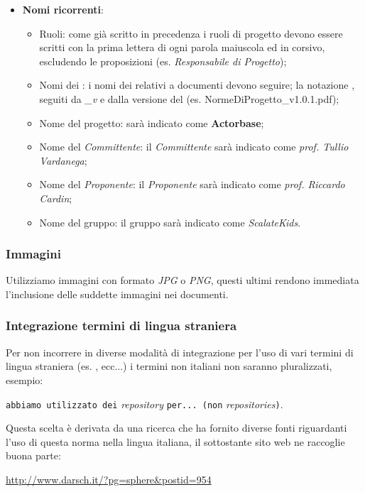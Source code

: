 \documentclass{scalatekids-article}
\begin{document}
\begin{itemize}
    \item \textbf{Nomi ricorrenti}:
        \begin{itemize}
            \item Ruoli: come già scritto in precedenza i ruoli di progetto devono essere scritti con la prima lettera di ogni parola maiuscola ed in corsivo, escludendo le proposizioni (es. \textit{Responsabile di Progetto});
            \item Nomi dei : i nomi dei  relativi a documenti devono seguire;
                la notazione \textit{}, seguiti da \textit{\_v} e dalla
                versione del  (es. NormeDiProgetto\_v1.0.1.pdf);
            \item Nome del progetto: sarà indicato come \textbf{Actorbase};
            \item Nome del \textit{Committente}: il \textit{Committente} sarà indicato come \textit{prof. Tullio Vardanega};
            \item Nome del \textit{Proponente}: il \textit{Proponente} sarà indicato come \textit{prof. Riccardo Cardin};
            \item Nome del gruppo: il gruppo sarà indicato come \textit{ScalateKids}.
        \end{itemize}
\end{itemize}

\subsubsection{Immagini}

Utilizziamo immagini con formato \textit{JPG} o \textit{PNG}, questi ultimi rendono immediata l'inclusione delle suddette immagini nei documenti.

\subsubsection{Integrazione termini di lingua straniera}

Per non incorrere in diverse modalità di integrazione per l'uso di vari termini di lingua straniera (es. ,  ecc...) i termini non italiani non saranno pluralizzati, esempio:\\
\begin{center}
    \verb=abbiamo utilizzato dei= \textit{repository} \verb=per... (non= \textit{repositories}\verb=)=.
\end{center}
Questa scelta è derivata da una ricerca che ha fornito diverse fonti riguardanti l'uso di questa norma nella lingua italiana, il sottostante sito web ne raccoglie buona parte:\\
\begin{center}
    \url{http://www.darsch.it/?pg=sphere&postid=954}
\end{center}
\end{document}
